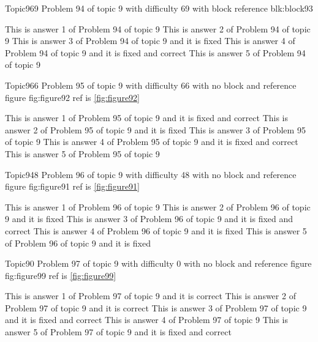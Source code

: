 \documentclass[master]{exam}
\begin{document}
\begin{problem}[requires=blk:block93]{Topic9}{69}
	Problem 94 of topic 9 with difficulty 69 with block reference blk:block93
	\begin{answers}
		\answer This is answer 1 of Problem 94 of topic 9 
		\answer This is answer 2 of Problem 94 of topic 9 
		\answer[fixed] This is answer 3 of Problem 94 of topic 9 and it is fixed
		 This is answer 4 of Problem 94 of topic 9 and it is fixed and correct
		\answer This is answer 5 of Problem 94 of topic 9 
	\end{answers}
\end{problem}

\begin{problem}{Topic9}{66}
	Problem 95 of topic 9 with difficulty 66 with no block and reference figure fig:figure92 ref is \ref{fig:figure92}
	\begin{answers}
		 This is answer 1 of Problem 95 of topic 9 and it is fixed and correct
		\answer[fixed] This is answer 2 of Problem 95 of topic 9 and it is fixed
		\answer This is answer 3 of Problem 95 of topic 9 
		 This is answer 4 of Problem 95 of topic 9 and it is fixed and correct
		\answer This is answer 5 of Problem 95 of topic 9 
	\end{answers}
\end{problem}

\begin{problem}{Topic9}{48}
	Problem 96 of topic 9 with difficulty 48 with no block and reference figure fig:figure91 ref is \ref{fig:figure91}
	\begin{answers}
		\answer This is answer 1 of Problem 96 of topic 9 
		\answer[fixed] This is answer 2 of Problem 96 of topic 9 and it is fixed
		 This is answer 3 of Problem 96 of topic 9 and it is fixed and correct
		\answer[fixed] This is answer 4 of Problem 96 of topic 9 and it is fixed
		\answer[fixed] This is answer 5 of Problem 96 of topic 9 and it is fixed
	\end{answers}
\end{problem}

\begin{problem}{Topic9}{0}
	Problem 97 of topic 9 with difficulty 0 with no block and reference figure fig:figure99 ref is \ref{fig:figure99}
	\begin{answers}
		\answer[correct] This is answer 1 of Problem 97 of topic 9 and it is correct
		\answer[correct] This is answer 2 of Problem 97 of topic 9 and it is correct
		 This is answer 3 of Problem 97 of topic 9 and it is fixed and correct
		\answer This is answer 4 of Problem 97 of topic 9 
		 This is answer 5 of Problem 97 of topic 9 and it is fixed and correct
	\end{answers}
\end{problem}
\end{document}
